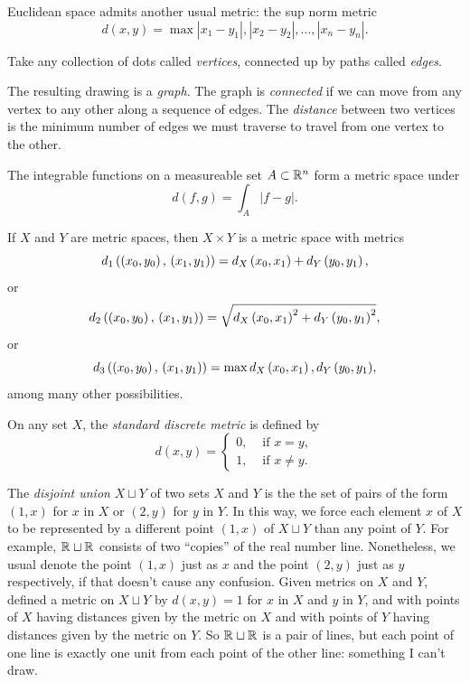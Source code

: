 \begin{example}
Euclidean space admits another usual metric: the sup norm metric
\[
d(x,y)=\max{\left|x_1-y_1\right|, \left|x_2-y_2\right|, \dots, \left|x_n-y_n\right|}.
\]
\end{example}
\begin{example}
Take any collection of dots called \emph{vertices}, connected up by paths called \emph{edges}.
\begin{center}

\end{center}
The resulting drawing is a \emph{graph}.
The graph is \emph{connected} if we can move from any vertex to any other along a sequence of edges.
The \emph{distance} between two vertices is the minimum number of edges we must traverse to travel from one vertex to the other.
\end{example}
\begin{example}
The integrable functions on a measureable set \(A \subset \mathbb{R}^{n}\) form a metric space under 
\[
d(f,g)=\int_A |f-g|.
\]
\end{example}
\begin{example}\label{item:product.metrics}
If \(X\) and \(Y\) are metric spaces, then \(X \times Y\) is a metric space with metrics
\[
d_1\left(\left(x_0,y_0\right), \, \left(x_1,y_1\right)\right)
=
d_X\left(x_0,x_1\right) + d_Y\left(y_0,y_1\right),
\]
or
\[
d_2\left(\left(x_0,y_0\right), \, \left(x_1,y_1\right)\right)
=
\sqrt{d_X\left(x_0,x_1\right)^2 + d_Y\left(y_0,y_1\right)^2},
\]
or
\[
d_3\left(\left(x_0,y_0\right), \, \left(x_1,y_1\right)\right)
=
\max{d_X\ensuremath{\left(x_0,x_1\right)},d_Y\ensuremath{\left(y_0,y_1\right)}},
\]
among many other possibilities.
\end{example}
\begin{example}
On any set \(X\), the \emph{standard discrete metric} is defined by
\[
d(x,y)=
\begin{cases}
0, & \text{ if \(x=y\)}, \\
1, & \text{ if \(x \ne y\)}.
\end{cases}
\]
\end{example}
\begin{example}
The \emph{disjoint union} \(X \sqcup Y\) of two sets \(X\) and \(Y\) is the the set of pairs of the form \((1,x)\) for \(x\) in \(X\) or \((2,y)\) for \(y\) in \(Y\).
In this way, we force each element \(x\) of \(X\) to be represented by a different point \((1,x)\) of \(X \sqcup Y\) than any point of \(Y\).
For example, \(\mathbb{R}^{} \sqcup \mathbb{R}^{}\) consists of two ``copies'' of the real number line.
Nonetheless, we usual denote the point \((1,x)\) just as \(x\) and the point \((2,y)\) just as \(y\) respectively, if that doesn't cause any confusion.
Given metrics on \(X\) and \(Y\), defined a metric on \(X \sqcup Y\) by \(d(x,y)=1\) for \(x\) in \(X\) and \(y\) in \(Y\), and with points of \(X\) having distances given by the metric on \(X\) and with points of \(Y\) having distances given by the metric on \(Y\).
So \(\mathbb{R}^{} \sqcup \mathbb{R}^{}\) is a pair of lines, but each point of one line is exactly one unit from each point of the other line: something I can't draw.
\end{example}
